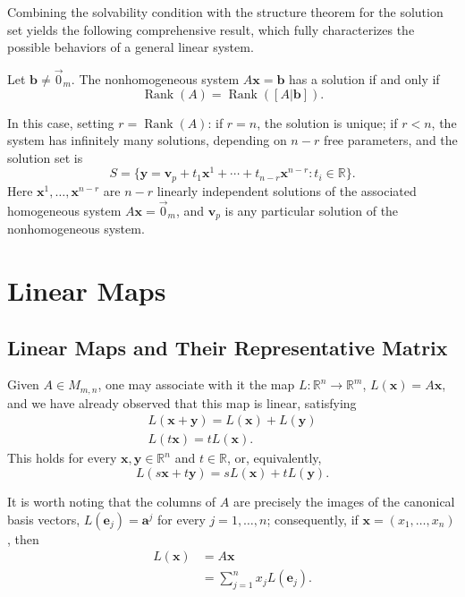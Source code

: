 Combining the solvability condition with the structure theorem for the solution set yields the following comprehensive result, which fully characterizes the possible behaviors of a general linear system.

\begin{theorem}
Let $\mathbf{b} \neq \vec{0}_m$. The nonhomogeneous system $A\mathbf{x} = \mathbf{b}$ has a solution if and only if
\[
\operatorname{Rank}(A) = \operatorname{Rank}([A|\mathbf{b}]).
\]

In this case, setting $r = \operatorname{Rank}(A)$: if $r = n$, the solution is unique; if $r < n$, the system has infinitely many solutions, depending on $n-r$ free parameters, and the solution set is
\[
S = \{ \mathbf{y} = \mathbf{v}_p + t_1 \mathbf{x}^1 + \cdots + t_{n-r} \mathbf{x}^{n-r} : t_i \in \mathbb{R} \}.
\]
Here $\mathbf{x}^1, \dots, \mathbf{x}^{n-r}$ are $n-r$ linearly independent solutions of the associated homogeneous system $A\mathbf{x} = \vec{0}_m$, and $\mathbf{v}_p$ is any particular solution of the nonhomogeneous system.
\end{theorem}

\section{Linear Maps}

\subsection{Linear Maps and Their Representative Matrix}

Given $A \in M_{m,n}$, one may associate with it the map $L : \mathbb{R}^n \to \mathbb{R}^m$, $L(\mathbf{x}) = A\mathbf{x}$, and we have already observed that this map is linear, satisfying
\[
\begin{gathered}
L(\mathbf{x}+\mathbf{y}) = L(\mathbf{x}) + L(\mathbf{y}) \\
L(t\mathbf{x}) = tL(\mathbf{x}).
\end{gathered}
\]
This holds for every $\mathbf{x}, \mathbf{y} \in \mathbb{R}^n$ and $t \in \mathbb{R}$, or, equivalently,
\[
L(s\mathbf{x}+t\mathbf{y}) = sL(\mathbf{x}) + tL(\mathbf{y}).
\]

It is worth noting that the columns of $A$ are precisely the images of the canonical basis vectors, $L(\mathbf{e}_j) = \mathbf{a}^j$ for every $j = 1, \dots, n$; consequently, if $\mathbf{x} = (x_1, \dots, x_n)$, then
\[
\begin{aligned}
L(\mathbf{x}) &= A\mathbf{x} \\
&= \sum_{j=1}^n x_j L(\mathbf{e}_j).
\end{aligned}
\]


